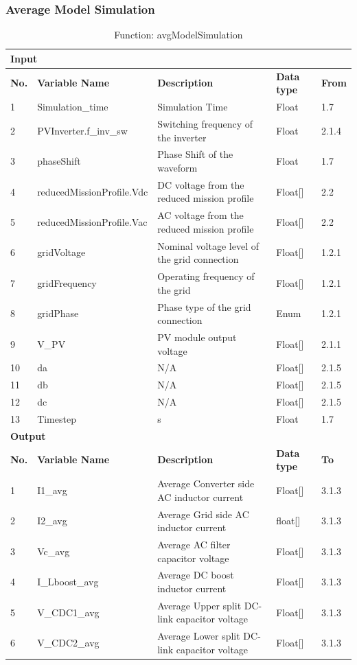 \documentclass{article}
\begin{document}
\subsubsection{Average Model Simulation}
\begin{table}[h]
\centering
\caption{Function: avgModelSimulation}
\begin{tabular}{|l|p{3.5cm}|p{5cm}|l|p{2cm}|}
\hline
\multicolumn{5}{|l|}{\textbf{Input}} \\ \hline
\textbf{No.} & \textbf{Variable Name} & \textbf{Description} & \textbf{Data type} & \textbf{From} \\ \hline
1 & Simulation\_time & Simulation Time & Float & 1.7 \\ \hline
2 & PVInverter.f\_inv\_sw & Switching frequency of the inverter & Float & 2.1.4 \\ \hline
3 & phaseShift & Phase Shift of the waveform & Float & 1.7 \\ \hline
4 & reducedMissionProfile.Vdc & DC voltage from the reduced mission profile & Float[] & 2.2 \\ \hline
5 & reducedMissionProfile.Vac & AC voltage from the reduced mission profile & Float[] & 2.2 \\ \hline
6 & gridVoltage & Nominal voltage level of the grid connection & Float[] & 1.2.1 \\ \hline
7 & gridFrequency & Operating frequency of the grid & Float[] & 1.2.1 \\ \hline
8 & gridPhase & Phase type of the grid connection & Enum & 1.2.1 \\ \hline
9 & V\_PV & PV module output voltage & Float[] & 2.1.1 \\ \hline
10 & da & N/A & Float[] & 2.1.5 \\ \hline
11 & db & N/A & Float[] & 2.1.5 \\ \hline
12 & dc & N/A & Float[] & 2.1.5 \\ \hline
13 & Timestep & s & Float & 1.7 \\ \hline
\multicolumn{5}{|l|}{\textbf{Output}} \\ \hline
\textbf{No.} & \textbf{Variable Name} & \textbf{Description} & \textbf{Data type} & \textbf{To} \\ \hline
1 & I1\_avg & Average Converter side AC inductor current & Float[] & 3.1.3 \\ \hline
2 & I2\_avg & Average Grid side AC inductor current & float[] & 3.1.3 \\ \hline
3 & Vc\_avg & Average AC filter capacitor voltage & Float[] & 3.1.3 \\ \hline
4 & I\_Lboost\_avg & Average DC boost inductor current & Float[] & 3.1.3 \\ \hline
5 & V\_CDC1\_avg & Average Upper split DC-link capacitor voltage & Float[] & 3.1.3 \\ \hline
6 & V\_CDC2\_avg & Average Lower split DC-link capacitor voltage & Float[] & 3.1.3 \\ \hline
\end{tabular}
\end{table}
\end{document}
